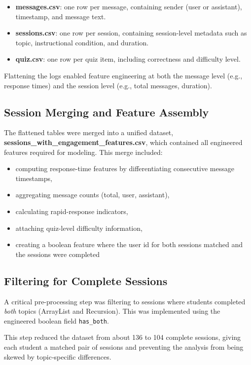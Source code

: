 \documentclass[conference]{IEEEtran}
\begin{document}
\begin{itemize}[noitemsep]
    \item \textbf{messages.csv}: one row per message, containing sender (user or assistant), timestamp, and message text.
    \item \textbf{sessions.csv}: one row per session, containing session-level metadata such as topic, instructional condition, and duration.
    \item \textbf{quiz.csv}: one row per quiz item, including correctness and difficulty level.
\end{itemize}

Flattening the logs enabled feature engineering at both the message level (e.g., response times) and the session level (e.g., total messages, duration).

\subsection{Session Merging and Feature Assembly}
The flattened tables were merged into a unified dataset, \textbf{sessions\_with\_engagement\_features.csv}, which contained all engineered features required for modeling. This merge included:

\begin{itemize}[noitemsep]
    \item computing response-time features by differentiating consecutive message timestamps,
    \item aggregating message counts (total, user, assistant),
    \item calculating rapid-response indicators,
    \item attaching quiz-level difficulty information,
    \item creating a boolean feature where the user id for both sessions matched and the sessions were completed
\end{itemize}



\subsection{Filtering for Complete Sessions}
A critical pre-processing step was filtering to sessions where students completed \emph{both} topics (ArrayList and Recursion). This was implemented using the engineered boolean field \texttt{has\_both}.

This step reduced the dataset from about 136 to 104 complete sessions, giving each student a matched pair of sessions and preventing the analysis from being skewed by topic‑specific differences.
\end{document}
